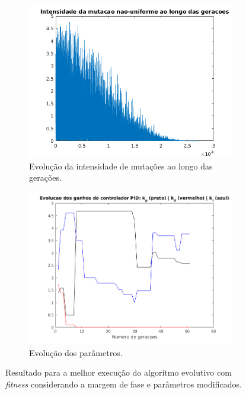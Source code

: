 \begin {enumerate}
\begin{figure}[h!]
		\begin{subfigure}{.5\textwidth}
		  \centering
		  \includegraphics[width=1\linewidth]{image/mutacao_pid_ex_d_mod}
		  \caption{\centering Evolução da intensidade de mutações ao longo das
		  gerações.}
		  \label{fig:pid_mutacao_d_5}
		\end{subfigure}%
		\begin{subfigure}{.5\textwidth}
		  \centering
		  \includegraphics[width=1\linewidth]{image/kp_kd_ki_pid_ex_d_mod}
		  \caption{\centering Evolução dos parâmetros.}
		  \label{fig:pid_parametros_d_mod} 
		\end{subfigure}
	
	\caption{Resultado para a melhor execução do algoritmo evolutivo com
	\textit{fitness} considerando a margem de fase e parâmetros modificados.}
	\end{figure}
	

\end{enumerate}
